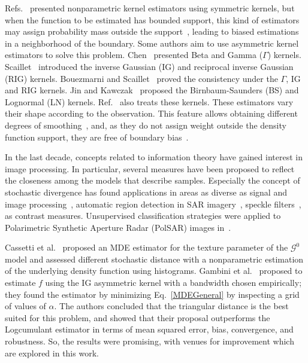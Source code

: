 \documentclass[twocolumn]{svjour3}
\begin{document}
	Refs.~\cite{Parzen62,Roseanblatt56} presented nonparametric kernel estimators using symmetric kernels, but when the function to be estimated has bounded support, this kind of estimators may assign probability mass outside the support~\cite{Silverman1986}, leading to biased estimations in a neighborhood of the boundary.
	Some authors aim to use asymmetric kernel estimators to solve this problem. 
	Chen~\cite{chen1999,chensx2000} presented Beta and Gamma ($\Gamma$) kernels.
	Scaillet~\cite{Scaillet2004} introduced the inverse Gaussian (IG) and reciprocal inverse Gaussian (RIG) kernels.
	Bouezmarni and Scaillet~\cite{bouezmarni2005} proved the consistency under the $\Gamma$, IG and RIG kernels. 
	Jin and Kawczak~\cite{Jin2003} proposed the Birnbaum-Saunders (BS) and Lognormal (LN) kernels. 
	Ref.~\cite{libengue2013} also treats these kernels. 
	These estimators vary their shape according to the observation. This feature allows obtaining different degrees of smoothing~\cite{Scaillet2004}, and, as they do not assign weight outside the density function support, they are free of boundary bias~\cite{chensx2000}.
	
	In the last decade, concepts related to information theory have gained interest in image processing. 
	In particular, several measures have been proposed to reflect the closeness among the models that describe samples. 
	Especially the concept of stochastic divergence has found applications in areas as diverse as signal and image processing~\cite{Aviyente2007}, automatic region detection in SAR imagery~\cite{SilvaCribariFrery:ImprovedLikelihood:Environmetrics,Nascimento2009}, 
	speckle filters~\cite{Penna2019}, as contrast measures. 
	Unsupervised classification strategies were applied to Polarimetric Synthetic Aperture Radar (PolSAR) images in~\cite{Carvalho2019}.
	
	Cassetti et al.~\cite{APSAR2013ParameterEstimationStochasticDistances} proposed an MDE estimator for the texture parameter of the $\mathcal{G}^0$ model and assessed different stochastic distance with a nonparametric estimation of the underlying density function using histograms. 
	Gambini et al.~\cite{gambini2015} proposed to estimate $f$ using the IG asymmetric kernel with a bandwidth chosen empirically; 
	they found the estimator by minimizing Eq.~\eqref{MDEGeneral} by inspecting a grid of values of $\alpha$. 
	The authors concluded that the triangular distance is the best suited for this problem, and showed that their proposal outperforms the Logcumulant estimator in terms of mean squared error, bias, convergence, and robustness. 
	So, the results were promising, with venues for improvement which are explored in this work.
	
\end{document}
